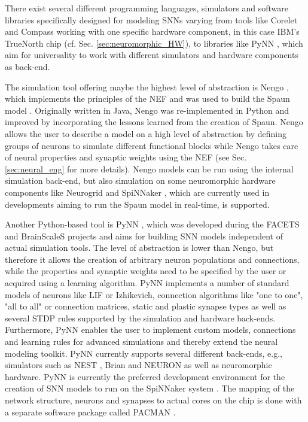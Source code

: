 There exist several different programming languages, simulators and software libraries specifically designed for modeling \acp{SNN} varying from tools like Corelet \cite{Amir2013} and Compass \cite{Preissl2012} working with one specific hardware component, in this case IBM's TrueNorth chip \cite{Akopyan2015} (cf. Sec. \ref{sec:neuromorphic_HW}), to libraries like \ac{PyNN} \cite{Davison2008}, which aim for universality to work with different simulators and hardware components as back-end.

The simulation tool offering maybe the highest level of abstraction is \ac{Nengo} \cite{Stewart2009}, which implements the principles of the \ac{NEF} \cite{Eliasmith2003} and was used to build the \ac{Spaun} model \cite{Eliasmith2012}.
Originally written in Java, \ac{Nengo} was re-implemented in Python \cite{Bekolay2014} and improved by incorporating the lessons learned from the creation of \ac{Spaun}.
\ac{Nengo} allows the user to describe a model on a high level of abstraction by defining groups of neurons to simulate different functional blocks while \ac{Nengo} takes care of neural properties and synaptic weights using the \ac{NEF} (see Sec. \ref{sec:neural_eng} for more details).
\ac{Nengo} models can be run using the internal simulation back-end, but also simulation on some neuromorphic hardware components like Neurogrid \cite{Dethier2011, Choudhary2012} and \ac{SpiNNaker} \cite{Mundy2015}, which are currently used in developments aiming to run the \ac{Spaun} model in real-time, is supported.

Another Python-based tool is \ac{PyNN} \cite{Davies2010}, which was developed during the \ac{FACETS} \cite{FACETS-proj} and \ac{BrainScaleS} \cite{BrainScaleS-proj} projects and aims for building \ac{SNN} models independent of actual simulation tools.
The level of abstraction is lower than \ac{Nengo}, but therefore it allows the creation of arbitrary neuron populations and connections, while the properties and synaptic weights need to be specified by the user or acquired using a learning algorithm.
\ac{PyNN} implements a number of standard models of neurons like \ac{LIF} or Izhikevich, connection algorithms like "one to one", "all to all" or connection matrices, static and plastic synapse types as well as several \ac{STDP} rules supported by the simulation and hardware back-ends.
Furthermore, \ac{PyNN} enables the user to implement custom models, connections and learning rules for advanced simulations and thereby extend the neural modeling toolkit.
\ac{PyNN} currently supports several different back-ends, e.g., simulators such as \ac{NEST} \cite{Gewaltig2007}, Brian \cite{Goodman2009} and NEURON  \cite{Carnevale2009} as well as neuromorphic hardware.
\ac{PyNN} is currently the preferred development environment for the creation of \ac{SNN} models to run on the \ac{SpiNNaker} system \cite{Furber2014}.
The mapping of the network structure, neurons and synapses to actual cores on the chip is done with a separate software package called \ac{PACMAN} \cite{Galluppi2012}.

